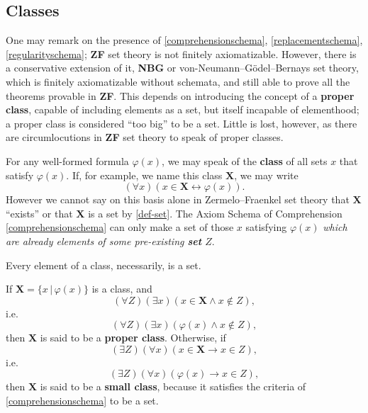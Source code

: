 \documentclass[letterpaper]{article}
\newcommand{\AxiomSchema}{{\large\LooseBearing}}
\newcommand{\Definition}{\raisebox{-0.25ex}{\large\dsliterary}}
\begin{document}
\subsection{Classes}
One may remark on the presence of \AxiomSchema\AxiomSchema \ref{comprehensionschema}, \ref{replacementschema}, \ref{regularityschema}; \textbf{ZF} set theory is not finitely axiomatizable.  However, there is a conservative extension of it, \textbf{NBG} or von-Neumann--G{\"o}del--Bernays set theory, which is finitely axiomatizable without schemata, and still able to prove all the theorems provable in \textbf{ZF}.  This depends on introducing the concept of a \textbf{proper class}, capable of including elements as a set, but itself incapable of elementhood; a proper class is considered ``too big'' to be a set.  Little is lost, however, as there are circumlocutions in \textbf{ZF} set theory to speak of proper classes.
\begin{circumlocution}
	For any well-formed formula $\varphi(x)$, we may speak of the \textbf{class} of all sets $x$ that satisfy $\varphi(x)$.  If, for example, we name this class $\mathbf{X}$, we may write
	\begin{equation}
	(\forall x)(x\in\mathbf X \longleftrightarrow \varphi(x)).
	\end{equation}
	However we cannot say on this basis alone in Zermelo--Fraenkel set theory that $\mathbf X$ ``exists'' or that $\mathbf X$ is a set by \Definition \ref{def-set}.  The Axiom Schema of Comprehension \AxiomSchema \ref{comprehensionschema} can only make a set of those $x$ satisfying $\varphi(x)$ \textit{which are already elements of some pre-existing \textbf{set} $Z$}.
\end{circumlocution}
\begin{remark}
	Every element of a class, necessarily, is a set.
\end{remark}
\begin{circumlocution}
	If $\mathbf X=\{x\,|\,\varphi(x)\}$ is a class, and
	\begin{equation}
	(\forall Z)(\exists x)(x\in\mathbf X\land x\notin Z),
	\end{equation}
	i.e.\
	\begin{equation}
	(\forall Z)(\exists x)(\varphi(x)\land x\notin Z),	
	\end{equation}
	then $\mathbf X$ is said to be a \textbf{proper class}.  Otherwise,
	if
	\begin{equation}
	(\exists Z)(\forall x)(x\in\mathbf X\longrightarrow x\in Z),
	\end{equation}
	i.e.\
	\begin{equation}
	(\exists Z)(\forall x)(\varphi(x)\longrightarrow x\in Z),
	\end{equation}
	then $\mathbf X$ is said to be a \textbf{small class}, because it satisfies the criteria of \AxiomSchema \ref{comprehensionschema} to be a set.
\end{circumlocution}
\end{document}
